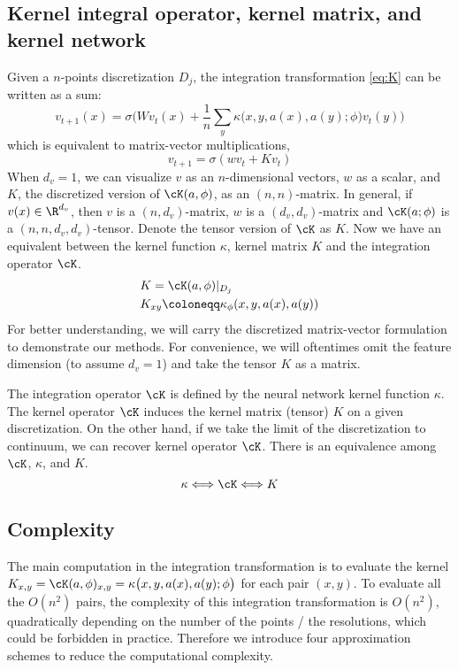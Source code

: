 \subsection{Kernel integral operator, kernel matrix, and kernel network}
Given a $n$-points discretization $D_j$, the integration transformation \ref{eq:K} can be written as a sum:
\begin{equation}
    \label{eq:K_sum}
    v_{t+1}(x) = \sigma\bigl( W v_t(x) + \frac{1}{n} \sum_y \kappa\big(x,y,a(x),a(y);\phi\big) v_t(y) \bigr)
\end{equation}
which is equivalent to matrix-vector multiplications, 
\begin{equation}
    \label{eq:K_matrix}
    v_{t+1} = \sigma( w v_t + K v_t)
\end{equation}
When $d_v=1$, we can visualize $v$ as an $n$-dimensional vectors, $w$ as a scalar, and $K$, the discretized version of $\cK(a,\phi)$, as an $(n, n)$-matrix.
In general, if $v(x) \in \R^{d_v}$, then $v$ is a $(n, d_v)$-matrix, $w$ is a $(d_v,d_v)$-matrix and $\cK(a;\phi)$ is a $(n,n,d_v,d_v)$-tensor. Denote the tensor version of $\cK$ as $K$. 
Now we have an equivalent between the kernel function $\kappa$, kernel matrix $K$ and the integration operator $\cK$.
\begin{align*}
\label{eq:K_define}
    &K = \cK(a,\phi) |_{D_j}\\
    &K_{xy} \coloneqq \kappa_{\phi}(x,y,a(x),a(y)) 
\end{align*}
For better understanding, we will carry the discretized matrix-vector formulation to demonstrate our methods. For convenience, we will oftentimes omit the feature dimension (to assume $d_v = 1$) and take the tensor $K$ as a matrix.

\begin{remark}
The integration operator $\cK$ is defined by the neural network kernel function $\kappa$. The kernel operator $\cK$ induces the kernel matrix (tensor) $K$ on a given discretization. On the other hand, if we take the limit of the discretization to continuum, we can recover kernel operator $\cK$. There is an equivalence among $\cK$, $\kappa$, and $K$.
\[\kappa \Longleftrightarrow \cK \Longleftrightarrow K\]
\end{remark}

\subsection{Complexity} 
The main computation in the integration transformation is to evaluate the kernel $K_{x,y} = \cK(a, \phi)_{x,y} = \kappa\big(x,y,a(x),a(y);\phi\big)$ for each pair $(x,y)$. To evaluate all the $O(n^2)$ pairs, the complexity of this integration transformation is $O(n^2)$, quadratically depending on the number of the points / the resolutions, which could be forbidden in practice. Therefore we introduce four approximation schemes to reduce the computational complexity.

